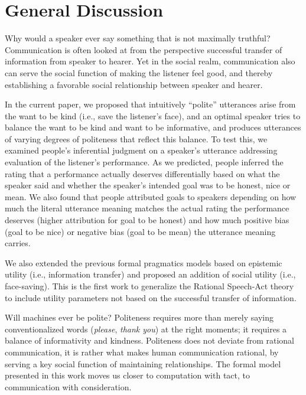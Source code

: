 \documentclass[10pt,letterpaper]{article}
\newcommand{\ndg}[1]{\textcolor{Green}{[ndg: #1]}}
\begin{document}
\section{General Discussion}


Why would a speaker ever say something that is not maximally truthful? 
Communication is often looked at from the perspective successful transfer of information from speaker to hearer. 
Yet in the social realm, communication also can serve the social function of making the listener feel good, and thereby establishing a favorable social relationship between speaker and hearer.

In the current paper, we proposed that intuitively ``polite'' utterances arise from the want to be kind (i.e., save the listener's face), and an optimal speaker tries to balance the want to be kind and want to be informative, and produces utterances of varying degrees of politeness that reflect this balance.
To test this, we examined people's inferential judgment on a speaker's utterance addressing evaluation of the listener's performance. 
As we predicted, people inferred the rating that a performance actually deserves
differentially based on what the speaker said and whether the speaker's intended goal was to be honest, nice or mean. 
We also found that people attributed goals to speakers depending on 
how much the literal utterance meaning matches the actual rating the performance deserves (higher attribution for goal to be honest) 
and how much positive bias (goal to be nice) or negative bias (goal to be mean) the utterance meaning carries. 

We also extended the previous formal pragmatics models based on epistemic utility (i.e., information transfer)
and proposed an addition of social utility (i.e., face-saving).
This is the first work to generalize the Rational Speech-Act theory to include utility parameters not based on the successful transfer of information. 

Will machines ever be polite? 
Politeness requires more than merely saying conventionalized words (\emph{please}, \emph{thank you}) at the right moments; it requires a balance of informativity and kindness. 
Politeness does not deviate from rational communication,
it is rather what makes human communication rational, by serving a key social function of maintaining relationships.
The formal model presented in this work moves us closer to computation with tact, to communication with consideration.





\setlength{\bibleftmargin}{.125in}
\setlength{\bibindent}{-\bibleftmargin}


\end{document}
